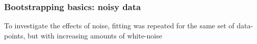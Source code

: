 \subsubsection{Bootstrapping basics: noisy data}

To investigate the effects of noise, fitting was repeated for the same set of data-points, but with increasing amounts of white-noise